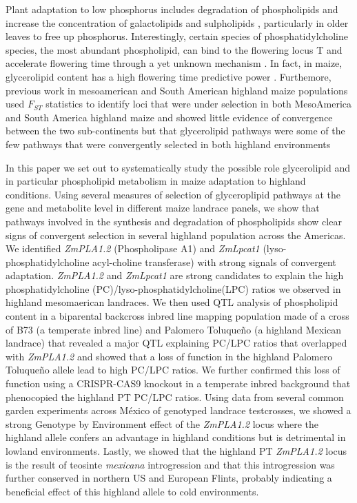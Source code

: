 \documentclass[9pt,twocolumn,twoside]{BioRxiv}
\begin{document}
Plant adaptation to low phosphorus includes degradation of phospholipids and increase the concentration of galactolipids and sulpholipids \cite{Lambers2012-an}, particularly in older leaves to free up phosphorus. 
Interestingly, certain species of phosphatidylcholine species, the most abundant phospholipid, can bind to the flowering locus T and accelerate flowering time through a yet unknown mechanism \cite{Nakamura2014-qf}. 
In fact, in maize, glycerolipid content has a high flowering time predictive power \cite{Riedelsheimer2013-bd}. 
Furthemore, previous work in mesoamerican and South American highland maize populations used $F_{ST}$ statistics to identify loci that were under selection in both MesoAmerica and South America highland maize and showed little evidence of convergence between the two sub-continents but that glycerolipid pathways were some of the few pathways that were convergently selected in both highland environments  \citep{Takuno2015-uj}

In this paper we set out to systematically study the possible role glycerolipid and in particular phospholipid metabolism in maize adaptation to highland conditions. 
Using several measures of selection of glyceroplipid pathways at the gene and metabolite level in different maize landrace panels, we show that pathways involved in the synthesis and degradation of phospholipids show clear signs of convergent selection in several highland population across the Americas. 
We identified \textit{ZmPLA1.2} (Phospholipase A1) and \textit{ZmLpcat1} (lyso-phosphatidylcholine acyl-choline transferase) with strong signals of convergent adaptation. \textit{ZmPLA1.2} and \textit{ZmLpcat1} are strong candidates to explain the high phosphatidylcholine (PC)/lyso-phosphatidylcholine(LPC) ratios we observed in highland mesomaerican landraces. 
We then used QTL analysis of phospholipid content in a biparental backcross inbred line mapping population made of a cross of B73 (a temperate inbred line) and Palomero Toluqueño (a highland Mexican landrace) that revealed a major QTL explaining PC/LPC ratios that overlapped with \textit{ZmPLA1.2} and showed that a loss of function in the highland Palomero Toluqueño allele lead to high PC/LPC ratios. 
We further confirmed this loss of function using a CRISPR-CAS9 knockout in a temperate inbred background that phenocopied the highland PT PC/LPC ratios. 
Using data from several common garden experiments across México of genotyped landrace testcrosses, we showed a strong Genotype by Environment effect of the \textit{ZmPLA1.2} locus where the highland allele confers an advantage in highland conditions but is detrimental in lowland environments. 
Lastly, we showed that the highland PT \textit{ZmPLA1.2} locus is the result of teosinte \textit{mexicana} introgression and that this introgression was further conserved in northern US and European Flints, probably indicating a beneficial effect of this highland allele to cold environments. 
\end{document}
